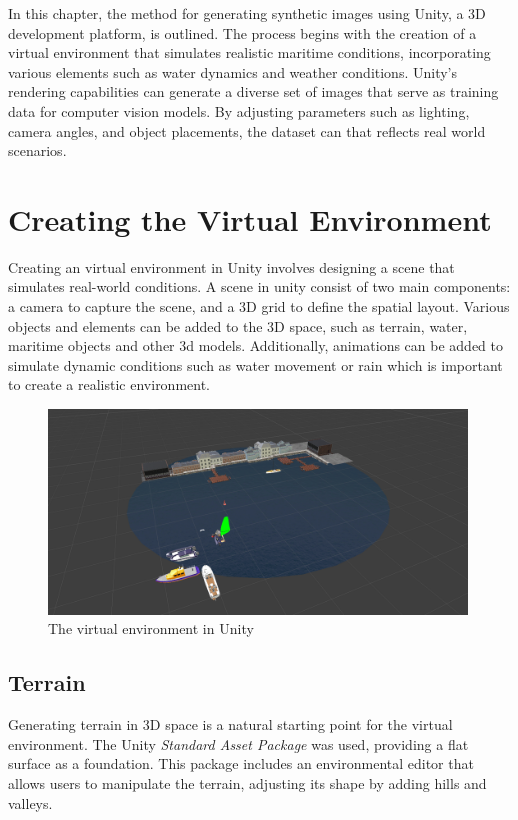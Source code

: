 
In this chapter, the method for generating synthetic images using Unity, a 3D development platform, is outlined. The process begins with the creation of a virtual environment that simulates realistic maritime conditions, incorporating various elements such as water dynamics and weather conditions. Unity's rendering capabilities can generate a diverse set of images that serve as training data for computer vision models. By adjusting parameters such as lighting, camera angles, and object placements, the dataset can that reflects real world scenarios. 


\section{Creating the Virtual Environment}
Creating an virtual environment in Unity involves designing a scene that simulates real-world conditions. A scene in unity consist of two main components: a camera to capture the scene, and a 3D grid to define the spatial layout. Various objects and elements can be added to the 3D space, such as terrain, water, maritime objects and other 3d models. Additionally, animations can be added to simulate dynamic conditions such as water movement or rain which is important to create a realistic environment. 

\begin{figure}[H]
    \centering
    \includegraphics[width=0.99\textwidth]{Figures/method/environment2.png}
    \caption{The virtual environment in Unity}
    \label{fig:environment}
    
\end{figure}
 
\subsection{Terrain}
Generating terrain in 3D space is a natural starting point for the virtual environment. The Unity \textit{Standard Asset Package} \cite{unity_standard_assets_installation} was used, providing a flat surface as a foundation. This package includes an environmental editor that allows users to manipulate the terrain, adjusting its shape by adding hills and valleys.

